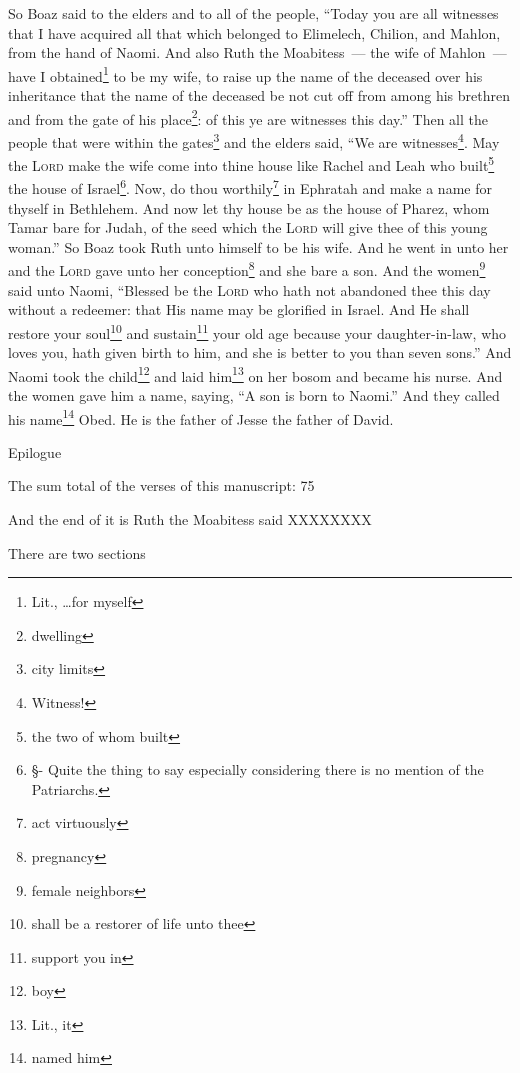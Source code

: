 \begin{enumerate}[align=center]
     So Boaz said to the elders and to all of the people, ``Today you are all witnesses that I have acquired all that which belonged to Elimelech, Chilion, and Mahlon, from the hand of Naomi.%
     And also Ruth the Moabitess~--- the wife of Mahlon~--- have I obtained\footnote{Lit., \dots for myself} to be my wife, to raise up the name of the deceased over his inheritance that the name of the deceased be not cut off from among his brethren and from the gate of his place\footnote{dwelling}: of this ye are witnesses this day.''%
     Then all the people that were within the gates\footnote{city limits} and the elders said, ``We are witnesses\footnote{Witness!}. May the \textsc{Lord} make the wife come into thine house like Rachel and Leah who built\footnote{the two of whom built} the house of Israel\footnote{\S - Quite the thing to say especially considering there is no mention of the Patriarchs.}. Now, do thou worthily\footnote{act virtuously} in Ephratah and make a name for thyself in Bethlehem.%
     And now let thy house be as the house of Pharez, whom Tamar bare for Judah, of the seed which the \textsc{Lord} will give thee of this young woman.''%
     So Boaz took Ruth unto himself to be his wife. And he went in unto her and the \textsc{Lord} gave unto her conception\footnote{pregnancy} and she bare a son.%
     And the women\footnote{female neighbors} said unto Naomi, ``Blessed be the \textsc{Lord} who hath not abandoned thee this day without a redeemer: that His name may be glorified in Israel.%
     And He shall restore your soul\footnote{shall be a restorer of life unto thee} and sustain\footnote{support you in} your old age because your daughter-in-law, who loves you, hath given birth to him, and she is better to you than seven sons.''%
     And Naomi took the child\footnote{boy} and laid him\footnote{Lit., it} on her bosom and became his nurse.%
     And the women gave him a name, saying, ``A son is born to Naomi.'' And they called his name\footnote{named him} Obed. He is the father of Jesse the father of David.%
\end{enumerate}

Epilogue

The sum total of the verses of this manuscript: 75

And the end of it is Ruth the Moabitess said XXXXXXXX

There are two sections
